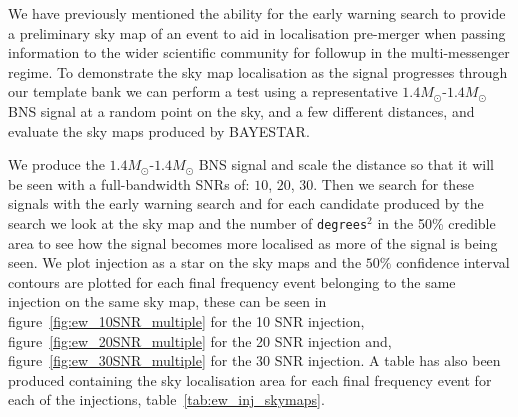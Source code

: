 We have previously mentioned the ability for the early warning search to provide a preliminary sky map of an event to aid in localisation pre-merger when passing information to the wider scientific community for followup in the multi-messenger regime. To demonstrate the sky map localisation as the signal progresses through our template bank we can perform a test using a representative $1.4M_\odot$-$1.4M_\odot$ BNS signal at a random point on the sky, and a few different distances, and evaluate the sky maps produced by BAYESTAR.


We produce the $1.4M_\odot$-$1.4M_\odot$ BNS signal and scale the distance so that it will be seen with a full-bandwidth SNRs of: $10$, $20$, $30$. Then we search for these signals with the early warning search and for each candidate produced by the search we look at the sky map and the number of \verb|degrees|$^2$ in the 50\% credible area to see how the signal becomes more localised as more of the signal is being seen. We plot injection as a star on the sky maps and the $50\%$ confidence interval contours are plotted for each final frequency event belonging to the same injection on the same sky map, these can be seen in figure~\ref{fig:ew_10SNR_multiple} for the 10 SNR injection, figure~\ref{fig:ew_20SNR_multiple} for the 20 SNR injection and, figure~\ref{fig:ew_30SNR_multiple} for the 30 SNR injection. A table has also been produced containing the sky localisation area for each final frequency event for each of the injections, table~\ref{tab:ew_inj_skymaps}.
%
%
%
